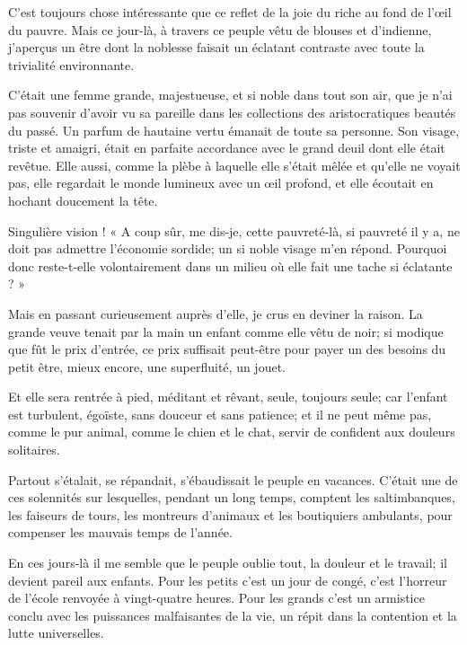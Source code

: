 C’est toujours chose intéressante que ce reflet de la
joie du riche au fond de l’\oe il du pauvre. Mais ce
jour{}-là, à travers ce peuple vêtu de blouses et
d’indienne, j’aperçus un être dont la
noblesse faisait un éclatant contraste avec toute la trivialité
environnante.

C’était une femme grande, majestueuse, et si noble dans
tout son air, que je n’ai pas souvenir
d’avoir vu sa pareille dans les collections des
aristocratiques beautés du passé. Un parfum de hautaine vertu émanait
de toute sa personne. Son visage, triste et amaigri, était en parfaite
accordance avec le grand deuil dont elle était revêtue. Elle aussi,
comme la plèbe à laquelle elle s’était mêlée et
qu’elle ne voyait pas, elle regardait le monde
lumineux avec un \oe il profond, et elle écoutait en hochant doucement la
tête.

Singulière vision ! « A coup sûr, me dis{}-je, cette pauvreté{}-là, si
pauvreté il y a, ne doit pas admettre l’économie
sordide; un si noble visage m’en répond. Pourquoi donc
reste{}-t{}-elle volontairement dans un milieu où elle fait une tache
si éclatante ? »

Mais en passant curieusement auprès d’elle, je crus en
deviner la raison. La grande veuve tenait par la main un enfant comme
elle vêtu de noir; si modique que fût le prix
d’entrée, ce prix suffisait peut{}-être pour payer un
des besoins du petit être, mieux encore, une superfluité, un jouet.

Et elle sera rentrée à pied, méditant et rêvant, seule, toujours seule;
car l’enfant est turbulent, égoïste, sans douceur et
sans patience; et il ne peut même pas, comme le pur animal, comme le
chien et le chat, servir de confident aux douleurs solitaires.


Partout s’étalait, se répandait,
s’ébaudissait le peuple en vacances.
C’était une de ces solennités sur lesquelles, pendant
un long temps, comptent les saltimbanques, les faiseurs de tours, les
montreurs d’animaux et les boutiquiers ambulants, pour
compenser les mauvais temps de l’année.

En ces jours{}-là il me semble que le peuple oublie tout, la douleur et
le travail; il devient pareil aux enfants. Pour les petits
c’est un jour de congé, c’est
l’horreur de l’école renvoyée à
vingt{}-quatre heures. Pour les grands c’est un
armistice conclu avec les puissances malfaisantes de la vie, un répit
dans la contention et la lutte universelles.

